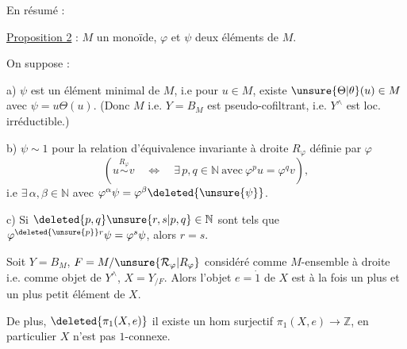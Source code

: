 
En résumé :

\uline{Proposition 2} :  $M$ un monoïde,  $\varphi$ et $\psi$ deux éléments de $M$.

On suppose :

a) $\psi$ est un élément minimal de $M$, i.e pour  $u\in M$, existe $\unsure{\Theta|\theta}(u)\in M$ avec $\psi=u\Theta(u)$. (Donc $M$ i.e. $Y=B_M$ est pseudo-cofiltrant, i.e. $Y^\wedge$ est loc. irréductible.)

b) $\psi\sim1$ pour la relation d'équivalence invariante à droite $R_\varphi$ définie par $\varphi$
\[
(u\overset{R_\varphi}{\sim}v\quad\Longleftrightarrow\quad\exists\,p,q\in\mathbb N\ \text{avec}\ \varphi^p u=\varphi^q v),
\]
i.e $\exists\,\alpha,\beta\in\mathbb N$ avec $\varphi^\alpha\psi=\varphi^\beta\deleted{\unsure{\psi}}$.

c) Si $\deleted{p,q}\unsure{r,s|p,q}\in\mathbb N$ sont tels que $\varphi^{\deleted{\unsure{p}}r}\psi=\varphi^s\psi$, alors $r=s$.

Soit $Y=B_M$, $F=M/\unsure{\mathcal R_\varphi|R_\varphi}$ considéré comme $M$-ensemble à droite i.e. comme objet de $Y^\wedge$, $X=Y_{/F}$. Alors l'objet $e=\dot 1$ de $X$ est à la fois un plus  et un plus petit élément de $X$.

De plus, $\deleted{\pi_{1}(X,e)}$ il existe un hom surjectif $\pi_1(X,e)\longrightarrow\mathbb Z$, en particulier $X$ n'est pas $1$-connexe.

